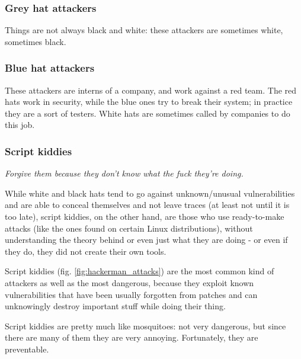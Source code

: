 
\subsubsection*{Grey hat attackers}
Things are not always black and white: these attackers are sometimes white, sometimes black.


\subsubsection*{Blue hat attackers}
These attackers are interns of a company, and work against a red team. The red hats work in security, while the blue ones try to break their system; in practice they are a sort of testers. White hats are sometimes called by companies to do this job.


\subsubsection*{Script kiddies}
\begin{center}
    \textit{Forgive them because they don't know what the fuck they're doing.}
\end{center}

While white and black hats tend to go against unknown/unusual vulnerabilities and are able to conceal themselves and not leave traces (at least not until it is too late), script kiddies, on the other hand, are those who use ready-to-make attacks (like the ones found on certain Linux distributions), without understanding the theory behind or even just what they are doing - or even if they do, they did not create their own tools.

Script kiddies (fig. \ref{fig:hackerman_attacks}) are the most common kind of attackers as well as the most dangerous, because they exploit known vulnerabilities that have been usually forgotten from patches and can unknowingly destroy important stuff while doing their thing.

Script kiddies are pretty much like mosquitoes: not very dangerous, but since there are many of them they are very annoying. Fortunately, they are preventable.

